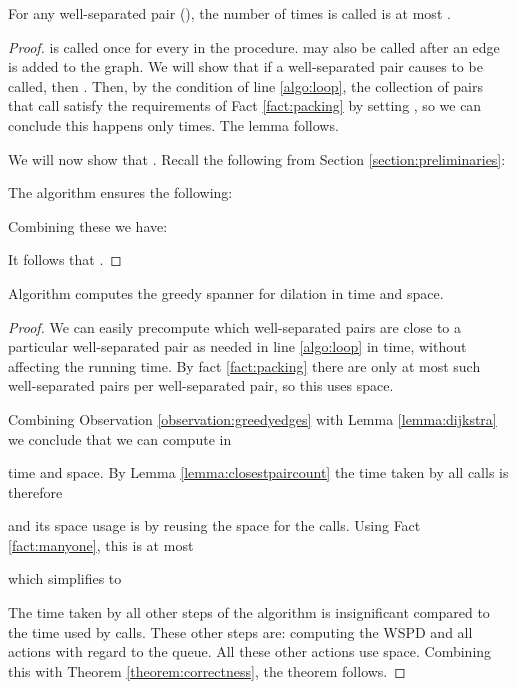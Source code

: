 \documentclass[runningheads,envcountsame,oribibl,orivec]{llncs}
\begin{document}
\begin{lemma} \label{lemma:closestpaircount}
For any well-separated pair  {\normalfont()}, the number of times  is called is at most .
\end{lemma}

\begin{proof}
 is called once for every  in the  procedure.  may also be called after an edge is added to the graph. We will show that if a well-separated pair  causes  to be called, then . Then, by the condition of line \ref{algo:loop}, the collection of pairs that call  satisfy the requirements of Fact \ref{fact:packing} by setting , so we can conclude this happens only  times. The lemma follows.

We will now show that . Recall the following from Section \ref{section:preliminaries}:


The algorithm ensures the following:


Combining these we have:


It follows that .
\end{proof}

\begin{theorem} \label{theorem:full}
Algorithm  computes the greedy spanner for dilation  in  time and  space.
\end{theorem}

\begin{proof}
We can easily precompute which well-separated pairs are close to a particular well-separated pair as needed in line \ref{algo:loop} in  time, without affecting the running time. By fact \ref{fact:packing} there are only at most  such well-separated pairs per well-separated pair, so this uses  space.

Combining Observation \ref{observation:greedyedges} with Lemma \ref{lemma:dijkstra} we conclude that we can compute  in

time and  space. By Lemma \ref{lemma:closestpaircount} the time taken by all  calls is therefore

and its space usage is  by reusing the space for the calls. Using Fact \ref{fact:manyone}, this is at most

which simplifies to


The time taken by all other steps of the algorithm is insignificant compared to the time used by  calls. These other steps are: computing the WSPD and all actions with regard to the queue. All these other actions use  space. Combining this with Theorem \ref{theorem:correctness}, the theorem follows.
\end{proof}
\end{document}
